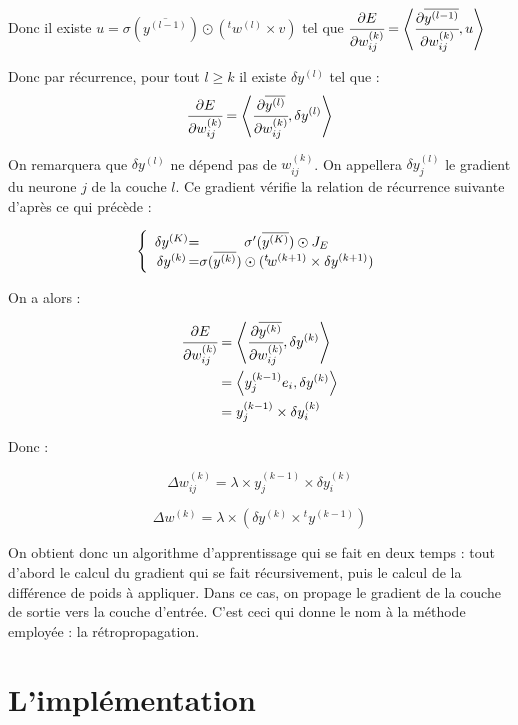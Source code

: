 Donc il existe $u = \sigma(\overline{y^{(l-1)}}) \odot ({}^t \! w^{(l)} \times v)$
tel que $\cfrac{\partial E}{\partial w_{ij}^{(k)}} = \left\langle\cfrac{\partial \overline{y^{(l-1)}}}{\partial w_{ij}^{(k)}} ,u\right\rangle$

Donc par récurrence, pour tout $l \geq k$ il existe $\delta y^{(l)}$ tel que :
\[\cfrac{\partial E}{\partial w_{ij}^{(k)}} = \left\langle\cfrac{\partial \overline{y^{(l)}}}{\partial w_{ij}^{(k)}} ,\delta y^{(l)}\right\rangle\]

On remarquera que $\delta y^{(l)}$ ne dépend pas de $w_{ij}^{(k)}$. On appellera
 $\delta y^{(l)}_j$ le gradient du neurone $j$ de la couche $l$. Ce gradient
 vérifie la relation de récurrence suivante d'après ce qui précède :

\[
\left \{
\begin{array}{c @{=} c}
    \delta y^{(K)} & \sigma'(\overline{y^{(K)}}) \odot J_E\\
    \delta y^{(k)} & \sigma(\overline{y^{(k)}}) \odot ({}^t \! w^{(k+1)} \times \delta y^{(k+1)})\\
\end{array}
\right.
\]

On a alors :

\begin{align*}
\cfrac{\partial E}{\partial w_{ij}^{(k)}} &= \left\langle\cfrac{\partial \overline{y^{(k)}}}{\partial w_{ij}^{(k)}} ,\delta y^{(k)}\right\rangle\\
&= \left\langle y^{(k-1)}_j e_i,\delta y^{(k)}\right\rangle\\
& = y^{(k-1)}_j \times \delta y^{(k)}_i
\end{align*}

Donc :

\[\Delta w^{(k)}_{ij} = \lambda \times y^{(k-1)}_j \times \delta y^{(k)}_i\]

\[\Delta w^{(k)} = \lambda \times (\delta y^{(k)} \times {}^t \! y^{(k-1)})\]

On obtient donc un algorithme d'apprentissage qui se fait en deux temps : tout
d'abord le calcul du gradient qui se fait récursivement, puis le calcul de la
différence de poids à appliquer. Dans ce cas, on propage le gradient de la couche
de sortie vers la couche d'entrée. C'est ceci qui donne le nom à la
méthode employée : la rétropropagation.

\section{L'implémentation}

